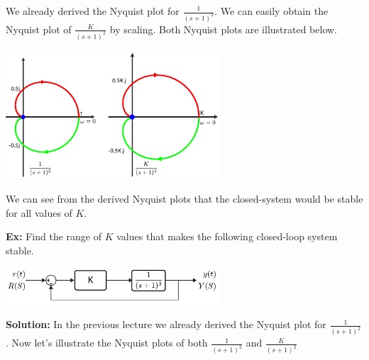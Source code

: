 \documentclass{article}
\begin{document}
We already derived the Nyquist plot for $\frac{1}{(s+1)^2}$. 
We can easily obtain the Nyquist plot of $\frac{K}{(s+1)^2}$
by scaling. Both Nyquist plots are illustrated below. 

\vspace{6 pt}

  \begin{minipage}[h]{1\linewidth}
    \begin{center}
      \includegraphics[width=0.6\textwidth]{figs/exK}
    \end{center}
  \end{minipage}

\vspace{6 pt}

We can see from the derived Nyquist plots that the closed-system
would be stable for all values of $K$.

\vspace{6 pt}

\textbf{Ex:} Find the range of $K$ values that makes the
following closed-loop system stable. 

\vspace{6 pt}

  \begin{minipage}[h]{1\linewidth}
    \begin{center}
      \includegraphics[width=0.6\textwidth]{figs/ex3block}
    \end{center}
  \end{minipage}

\vspace{6 pt}

\textbf{Solution:} In the previous lecture we already derived the
Nyquist plot for $\frac{1}{(s+1)^2}$. Now let's illustrate the Nyquist
plots of both $\frac{1}{(s+1)^2}$ and $\frac{K}{(s+1)^2}$

\vspace{6 pt}
\end{document}
